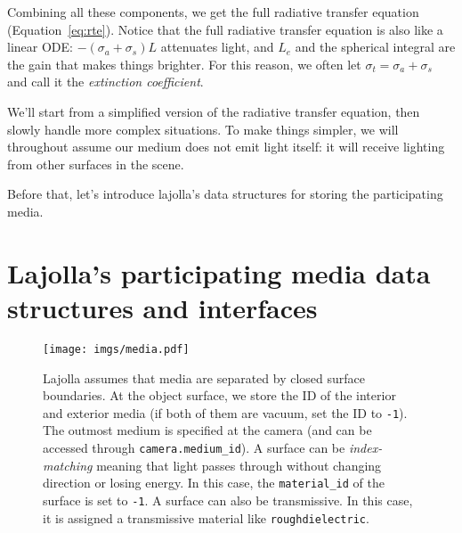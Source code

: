 Combining all these components, we get the full radiative transfer equation (Equation~\ref{eq:rte}). Notice that the full radiative transfer equation is also like a linear ODE: $-(\sigma_a + \sigma_s) L$ attenuates light, and $L_e$ and the spherical integral are the gain that makes things brighter. For this reason, we often let $\sigma_t = \sigma_a + \sigma_s$ and call it the \emph{extinction coefficient}.

We'll start from a simplified version of the radiative transfer equation, then slowly handle more complex situations. To make things simpler, we will throughout assume our medium does not emit light itself: it will receive lighting from other surfaces in the scene.

Before that, let's introduce lajolla's data structures for storing the participating media.

\section{Lajolla's participating media data structures and interfaces}
\begin{figure}
    \texttt{[image: imgs/media.pdf]}
    \caption{Lajolla assumes that media are separated by closed surface boundaries. At the object surface, we store the ID of the interior and exterior media (if both of them are vacuum, set the ID to \lstinline{-1}). The outmost medium is specified at the camera (and can be accessed through \lstinline{camera.medium_id}). A surface can be \emph{index-matching} meaning that light passes through without changing direction or losing energy. In this case, the \lstinline{material_id} of the surface is set to \lstinline{-1}. A surface can also be transmissive. In this case, it is assigned a transmissive material like \lstinline{roughdielectric}.}
    \label{fig:data_structure}
\end{figure}

